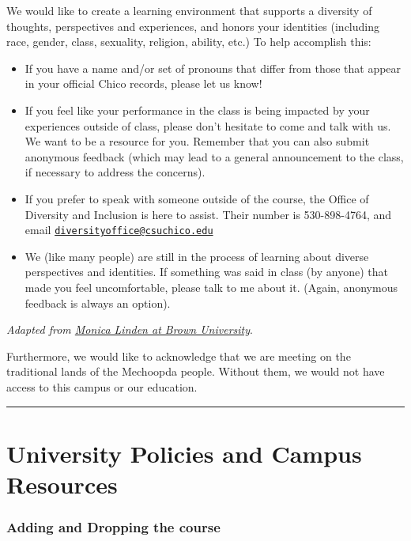 \documentclass[
  11pt,
]{article}
\providecommand{\tightlist}{%
  \setlength{\itemsep}{0pt}\setlength{\parskip}{0pt}}
\begin{document}
We would like to create a learning environment that supports a diversity
of thoughts, perspectives and experiences, and honors your identities
(including race, gender, class, sexuality, religion, ability, etc.) To
help accomplish this:

\begin{itemize}
\tightlist
\item
  If you have a name and/or set of pronouns that differ from those that
  appear in your official Chico records, please let us know!
\item
  If you feel like your performance in the class is being impacted by
  your experiences outside of class, please don't hesitate to come and
  talk with us. We want to be a resource for you. Remember that you can
  also submit anonymous feedback (which may lead to a general
  announcement to the class, if necessary to address the concerns).
\item
  If you prefer to speak with someone outside of the course, the Office
  of Diversity and Inclusion is here to assist. Their number is
  530-898-4764, and email
  \href{mailto:diversityoffice@csuchico.edu}{\nolinkurl{diversityoffice@csuchico.edu}}
\item
  We (like many people) are still in the process of learning about
  diverse perspectives and identities. If something was said in class
  (by anyone) that made you feel uncomfortable, please talk to me about
  it. (Again, anonymous feedback is always an option).
\end{itemize}

\emph{Adapted from
\href{https://www.brown.edu/sheridan/teaching-learning-resources/inclusive-teaching/statements}{Monica
Linden at Brown University}}.

Furthermore, we would like to acknowledge that we are meeting on the
traditional lands of the Mechoopda people. Without them, we would not
have access to this campus or our education.

\begin{center}\rule{0.5\linewidth}{0.5pt}\end{center}

\hypertarget{university-policies-and-campus-resources}{%
\section{University Policies and Campus
Resources}\label{university-policies-and-campus-resources}}

\hypertarget{adding-and-dropping-the-course}{%
\subsubsection{Adding and Dropping the
course}\label{adding-and-dropping-the-course}}
\end{document}
